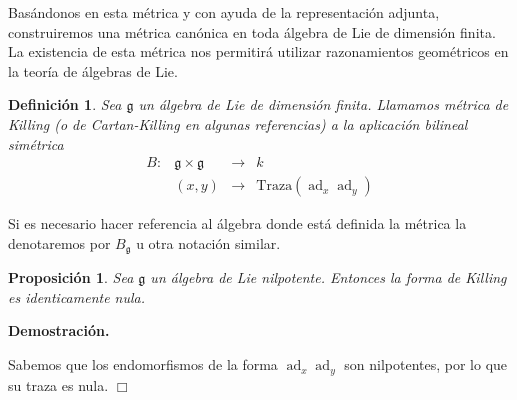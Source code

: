 \documentclass[a4paper,draft,12pt]{article}
\newtheorem{defi}{Definición}[section]%
\newtheorem{propo}[teo]{Proposición}%
\newcommand{\dem}{\noindent \textbf{Demostración. }\vspace{0.3 cm}}%
\newcommand{\g}{\mathfrak{g}}%
\newcommand{\fin}{ $\Box $ \vspace{0.4 cm}}
\newcommand{\lto}{\longrightarrow}%
\newcommand{\df}[1]{\textsf{\color{blue}#1}}
\DeclareMathOperator{\ad}{ad}  %
\begin{document}
Basándonos en esta métrica y con ayuda de la representación adjunta, construiremos una métrica canónica en toda álgebra de Lie de dimensión finita.  La existencia de esta métrica nos permitirá utilizar razonamientos geométricos en la teoría de álgebras de Lie.

\begin{defi}

Sea $\g$ un álgebra de Lie de dimensión finita.  Llamamos  \df{métri\-ca de Killing}  (o de Cartan-Killing en algunas referencias) a la aplicación bilineal simétrica
$$
\begin{array}{rccc}
B: & \g \times \g & \lto & k \\
   &  (x,y) & \lto & \mathrm{Traza}(\ad_x\ad_y)
\end{array}
$$

\end{defi}

Si es necesario hacer referencia al álgebra donde está definida la métrica la denotaremos por $B_\g$ u otra notación similar.

\begin{propo}

Sea $\g$ un álgebra de Lie nilpotente.  Entonces la forma de Killing es identicamente nula.

\end{propo}

\dem

Sabemos que los endomorfismos de la forma $\ad_x\ad_y$ son nilpotentes, por lo que su traza es nula.  \fin

\bigskip

\end{document}
